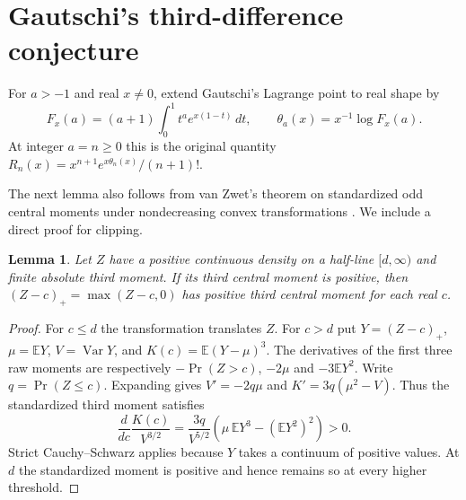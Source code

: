 \documentclass[11pt,a4paper]{article}
\newtheorem{lemma}[theorem]{Lemma}
\begin{document}
\section{Gautschi's third-difference conjecture}

For $a>-1$ and real $x\ne0$, extend Gautschi's Lagrange point
\cite{gautschi} to real shape by
\[
 F_x(a)=(a+1)\int_0^1 t^a e^{x(1-t)}\,dt,\qquad
 \theta_a(x)=x^{-1}\log F_x(a).
\]
At integer $a=n\ge0$ this is the original quantity
$R_n(x)=x^{n+1}e^{x\theta_n(x)}/(n+1)!$.

The next lemma also follows from van Zwet's theorem on standardized odd central moments under nondecreasing convex transformations \cite[Theorem~2.2.1]{vanzwet}. We include a direct proof for clipping.

\begin{lemma}\label{lem:positive-part}
Let $Z$ have a positive continuous density on a half-line $[d,\infty)$
and finite absolute third moment. If its third central moment is positive,
then $(Z-c)_+=\max(Z-c,0)$ has positive third central moment for each real $c$.
\end{lemma}
\begin{proof}
For $c\le d$ the transformation translates $Z$. For $c>d$ put
$Y=(Z-c)_+$, $\mu=\mathbb E Y$, $V=\operatorname{Var}Y$,
and $K(c)=\mathbb E(Y-\mu)^3$. The derivatives of the first three
raw moments are respectively $-\Pr(Z>c)$, $-2\mu$ and
$-3\mathbb E Y^2$. Write $q=\Pr(Z\le c)$. Expanding gives $V'=-2q\mu$ and $K'=3q(\mu^2-V)$. Thus the standardized third moment satisfies
\[
 \frac{d}{dc}\frac{K(c)}{V^{3/2}}=
 \frac{3q}{V^{5/2}}
 \left(\mu\,\mathbb E Y^3-(\mathbb E Y^2)^2\right)>0.
\]
Strict Cauchy--Schwarz applies because $Y$ takes a continuum of positive values. At $d$ the standardized moment is positive and hence remains so at every higher threshold.
\end{proof}
\end{document}
